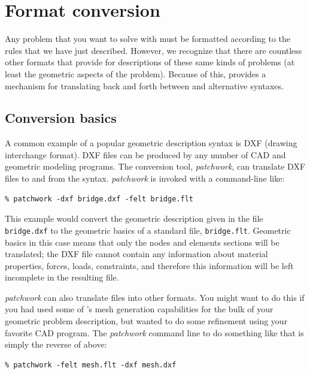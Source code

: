 \section{Format conversion}

Any problem that you want to solve with \felt{} must be formatted according
to the rules that we have just described.  However, we recognize that
there are countless other formats that provide for descriptions of these 
same kinds of problems (at least the geometric aspects of the problem). 
Because of this, \felt{} provides a mechanism for translating back and forth
between \felt{} and alternative syntaxes. 

\subsection{Conversion basics}

A common example of a popular geometric description syntax is DXF (drawing 
interchange format).  DXF files can be produced by any number of CAD and
geometric modeling programs.  The \felt{} conversion tool, {\em patchwork},
can translate DXF files to and from the \felt{} syntax.  {\em patchwork}
is invoked with a command-line like:

\begin{screen}
 \begin{verbatim}
% patchwork -dxf bridge.dxf -felt bridge.flt
 \end{verbatim}
\end{screen}

This example would convert the geometric description given in the file
{\tt bridge.dxf} to the geometric basics of a standard \felt{} file,
{\tt bridge.flt}.  Geometric basics in this case means that only the
nodes and elements sections will be translated; the DXF file cannot contain
any information about material properties, forces, loads, constraints, and
therefore this information will be left incomplete in the resulting \felt{}
file.

{\em patchwork} can also translate \felt{} files into other formats.  You
might want to do this if you had used some of \felt{}'s mesh generation 
capabilities for the bulk of your geometric problem description, but wanted
to do some refinement using your favorite CAD program.  The {\em patchwork}
command line to do something like that is simply the reverse of above:
\begin{screen}
 \begin{verbatim}
% patchwork -felt mesh.flt -dxf mesh.dxf 
 \end{verbatim}
\end{screen}

